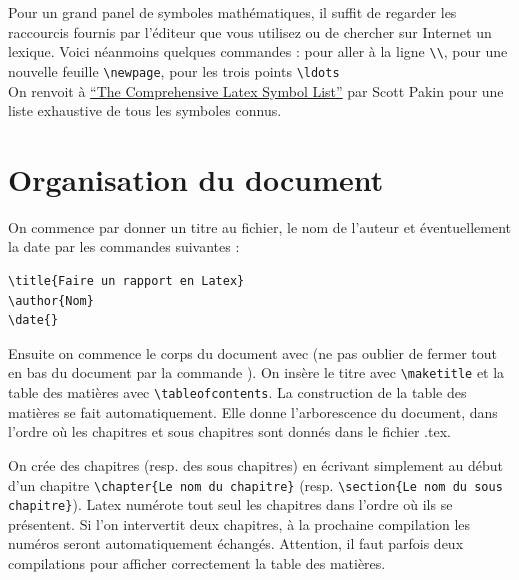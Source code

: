Pour un grand panel de symboles mathématiques, il suffit de regarder les raccourcis fournis par l'éditeur 
que vous utilisez ou de chercher sur Internet un lexique. Voici néanmoins quelques commandes : 
pour aller à la ligne  \lstinline+\\+, 
pour une nouvelle feuille \lstinline+\newpage+, pour les trois points  \lstinline+\ldots+\medskip
\\
On renvoit à \href{http://www.tex.ac.uk/tex-archive/info/symbols/comprehensive/symbols-a4.pdf}
{``The Comprehensive Latex Symbol List''} par Scott Pakin pour une liste exhaustive de tous les
 symboles connus.


\section{Organisation du document}


On commence par donner un titre au  fichier, le nom de l'auteur et éventuellement la date par les
 commandes suivantes :\medskip

\begin{lstlisting}
\title{Faire un rapport en Latex} 
\author{Nom} 
\date{}
\end{lstlisting}



Ensuite on commence le corps du document avec \lstinline++ 
(ne pas oublier de fermer tout en bas du document par la commande \lstinline++). 
On insère le titre avec \lstinline+\maketitle+ et la table des matières avec \lstinline+\tableofcontents+.
La construction de la table des matières se fait automatiquement. 
Elle donne l'arborescence du document, dans l'ordre où les chapitres et sous chapitres sont donnés 
dans le fichier .tex.\medskip	


On crée  des chapitres (resp. des sous chapitres) en écrivant simplement au début d'un chapitre 
\lstinline+\chapter{Le nom du chapitre}+ 
(resp. \lstinline+\section{Le nom du sous chapitre}+).  
Latex numérote tout seul les chapitres dans l'ordre où ils se présentent. 
Si l'on intervertit deux chapitres, à la prochaine compilation les numéros seront automatiquement 
échangés. Attention, il faut parfois deux compilations pour afficher correctement la table des matières.  \medskip
 
